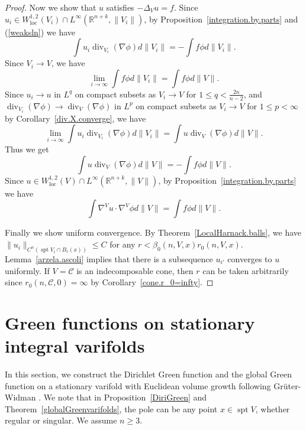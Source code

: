 \documentclass[11pt]{amsart}
\theoremstyle{definition}
\newcommand{\R}{\mathbb{R}}
\newcommand{\C}{\mathcal{C}}
\newcommand{\loc}{\mathrm{loc}}
\DeclareMathOperator{\spt}{spt}
\DeclareMathOperator{\Div}{div}
\begin{document}
\begin{proof}
	Now we show that $u$ satisfies $-\Delta_Vu=f$. Since $u_i\in W^{1,2}_\loc(V_i)\cap L^\infty(\R^{n+k},\|V_i\|)$, by Proposition~\ref{integration.by.parts} and (\ref{weaksln}) we have
	\[\int u_i\Div_{V_i}(\nabla\phi) d\|V_i\|=-\int f\phi d\|V_i\|.\]
	Since $V_i\to V$, we have \[\lim_{i\to\infty}\int f\phi d\|V_i\|= \int f\phi d\|V\|.\]
	Since $u_i\to u$ in $L^{q}$ on compact subsets as $V_i\to V$ for $1\le q<\frac{2n}{n-2}$, and $\Div_{V_i}(\nabla\phi)\to \Div_{V}(\nabla\phi)$ in $L^{p}$ on compact subsets as $V_i\to V$ for $1\le p<\infty$ by Corollary~\ref{div.X.converge}, we have
	\[\lim_{i\to\infty}\int u_i\Div_{V_i}(\nabla\phi)  d\|V_i\|=\int u\Div_{V}(\nabla\phi) d\|V\|.\]
	Thus we get 
	\[\int u\Div_{V}(\nabla\phi) d\|V\|=-\int f\phi d\|V\|.\]
	Since $u\in W^{1,2}_\loc(V)\cap L^\infty(\R^{n+k},\|V\|)$, by Proposition~\ref{integration.by.parts} we have 
	\[\int \nabla ^V u\cdot \nabla^V\phi d\|V\|=\int f\phi d\|V\|.\]

    Finally we show uniform convergence. By Theorem~\ref{LocalHarnack.balls}, we have $\|u_i\|_{C^\alpha(\spt V_i\cap B_r(x))}\le C$ for any $r<\beta_0(n,V,x) r_0(n,V,x)$. Lemma~\ref{arzela.ascoli} implies that there is a subsequence $u_{i'}$ converges to $u$ uniformly. If $V=\C$ is an indecomposable cone, then $r$ can be taken arbitrarily since $r_0(n,\C,0)=\infty$ by Corollary~\ref{cone.r_0=infty}.
\end{proof}

\section{Green functions on stationary integral varifolds}\label{greens.function.stationary.varifolds}
In this section, we construct the Dirichlet Green function and the global Green function on a stationary varifold with Euclidean volume growth following Gr\"uter-Widman \cite{gruter1982green}. We note that in Proposition~\ref{DiriGreen} and Theorem~\ref{globalGreenvarifolds}, the pole can be any point $x\in \spt V$, whether regular or singular. We assume $n\ge3$.
    
\end{document}
